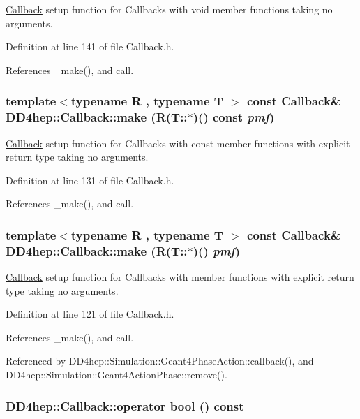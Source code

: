 \hyperlink{class_d_d4hep_1_1_callback}{Callback} setup function for Callbacks with void member functions taking no arguments. 

Definition at line 141 of file Callback.h.

References \_\-make(), and call.\hypertarget{class_d_d4hep_1_1_callback_a707ddd54e7fed776ae0db179178a5e65}{
\subsubsection[{make}]{\setlength{\rightskip}{0pt plus 5cm}template$<$typename R , typename T $>$ const {\bf Callback}\& DD4hep::Callback::make (R(T::$\ast$)() const  {\em pmf})}}
\label{class_d_d4hep_1_1_callback_a707ddd54e7fed776ae0db179178a5e65}


\hyperlink{class_d_d4hep_1_1_callback}{Callback} setup function for Callbacks with const member functions with explicit return type taking no arguments. 

Definition at line 131 of file Callback.h.

References \_\-make(), and call.\hypertarget{class_d_d4hep_1_1_callback_a3d90b335e05a60b5e27e53dadc68c40b}{
\subsubsection[{make}]{\setlength{\rightskip}{0pt plus 5cm}template$<$typename R , typename T $>$ const {\bf Callback}\& DD4hep::Callback::make (R(T::$\ast$)() {\em pmf})}}
\label{class_d_d4hep_1_1_callback_a3d90b335e05a60b5e27e53dadc68c40b}


\hyperlink{class_d_d4hep_1_1_callback}{Callback} setup function for Callbacks with member functions with explicit return type taking no arguments. 

Definition at line 121 of file Callback.h.

References \_\-make(), and call.

Referenced by DD4hep::Simulation::Geant4PhaseAction::callback(), and DD4hep::Simulation::Geant4ActionPhase::remove().\hypertarget{class_d_d4hep_1_1_callback_ad09cdf0e5d4dfe2a0f9a2f924ae5b930}{
\subsubsection[{operator bool}]{\setlength{\rightskip}{0pt plus 5cm}DD4hep::Callback::operator bool () const}}
\label{class_d_d4hep_1_1_callback_ad09cdf0e5d4dfe2a0f9a2f924ae5b930}


